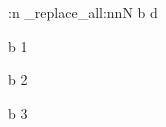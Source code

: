 \documentclass[12pt]{article}
\begin{document}
\ExplSyntaxOn
\rewriterest:n {
	\regex_replace_all:nnN {b} {d} \RWRbody
}
\ExplSyntaxOff

b 1 \par
b 2 \par
b 3
\end{document}
